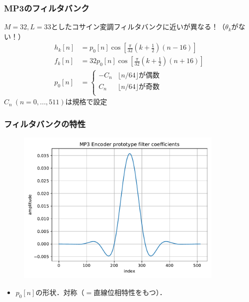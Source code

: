 \documentclass[14pt,xcolor=dvipsnames,table,dvipdfmx]{beamer}
\begin{document}
\begin{frame}[c]
    \frametitle{MP3のフィルタバンク}
    $M = 32, L = 33$としたコサイン変調フィルタバンク\alert{に近いが異なる！（$\theta_{k}$がない！）}
    \begin{align}
        h_{k}[n] &= p_{0}[n] \cos\left[ \frac{\pi}{32}\left( k + \frac{1}{2} \right) \left( n - 16 \right) \right] \\
        f_{k}[n] &= 32 p_{0}[n] \cos\left[ \frac{\pi}{32}\left( k + \frac{1}{2} \right) \left( n + 16 \right) \right] \\
        p_{0}[n] &= \left\{ \begin{array}{ll}
            -C_{n} & \lfloor n / 64 \rfloor \text{が偶数} \\
            C_{n} & \lfloor n / 64 \rfloor \text{が奇数} \\
        \end{array} \right.
    \end{align}
    $C_{n}\ (n = 0,...,511)$は規格で設定
\end{frame}

\begin{frame}[c]
    \frametitle{フィルタバンクの特性}
    \vspace{-5pt}
    \begin{figure}
        \includegraphics[width=100mm]{./figs/mp3_encoder_prototype_filter_coef.pdf}
    \end{figure}
    \vspace{-5pt}
    \begin{itemize}
        \item $p_{0}[n]$の形状．対称（$=$直線位相特性をもつ）．
    \end{itemize}
\end{frame}
\end{document}
